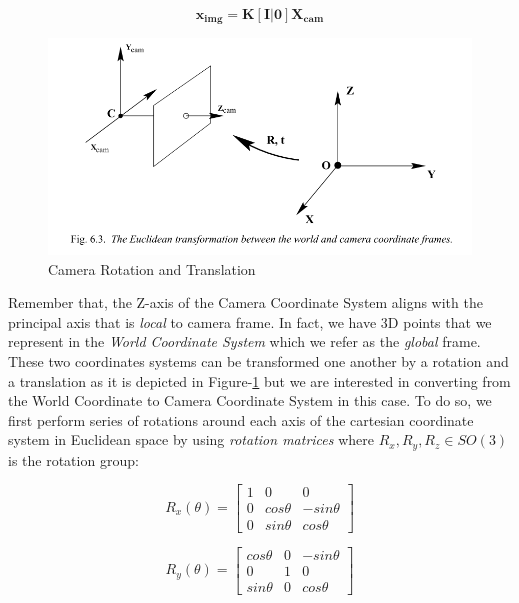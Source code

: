 \documentclass[a4paper]{report}
\numberwithin{figure}{section}
\begin{document}
\begin{equation}
  \mathbf{x_{img}} = \mathbf{K}[\mathbf{I}|\mathbf{0}]\mathbf{X_{cam}}
\end{equation} \label{eq:simplyfied_proj_func}

\begin{figure}[H]
	\centering
  \includegraphics[width=\linewidth,natwidth=640,natheight=640]
  {fig/ref_imgs/cam_model_rot_trans.png}
  \caption{Camera Rotation and Translation}
  \label{fig:cam_model_rot_trans}
\end{figure}

Remember that, the Z-axis of the Camera Coordinate System aligns with the 
principal axis that is \textit{local} to camera frame. In fact, we have 3D points that 
we represent in the \textit{World Coordinate System} 
which we refer as the \textit{global} frame. 
These two coordinates systems 
can be transformed one another by a rotation and a translation as it is 
depicted in Figure-\ref{fig:cam_model_rot_trans} but we are interested in 
converting from the World Coordinate to Camera Coordinate System in this case.
To do so, we first perform series of rotations around each axis of the 
cartesian coordinate system in Euclidean space by using 
\textit{rotation matrices} where $R_x, R_y, R_z \in SO(3)$ is the rotation group:

\begin{equation}
  R_x(\theta) = 
  \begin{bmatrix}
    1 & 0 & 0\\
    0 & cos\theta & -sin\theta\\
    0 & sin\theta & cos\theta
  \end{bmatrix}
\end{equation} \label{eq:rot_matrx_x}

\begin{equation}
  R_y(\theta) = 
  \begin{bmatrix}
    cos\theta & 0 & -sin\theta\\
    0 & 1 & 0\\
    sin\theta & 0 & cos\theta
  \end{bmatrix}
\end{equation} \label{eq:rot_matrx_y}
\end{document}
